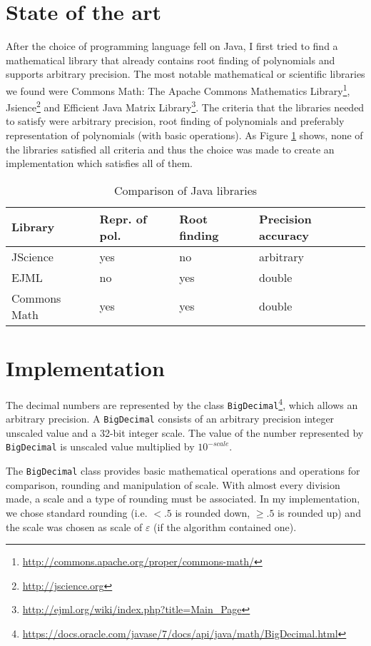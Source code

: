 \documentclass[
  digital, %
  notable,   %
  nolof,     %
  nolot,     %
	final, %
]{fithesis3}
\begin{document}
\section{State of the art}
After the choice of programming language fell on Java, I first tried to find a mathematical library that already contains root finding of polynomials and supports arbitrary precision. The most notable mathematical or scientific libraries we found were Commons Math: The Apache Commons Mathematics Library\footnote{\url{http://commons.apache.org/proper/commons-math/}}, Jsience\footnote{\url{http://jscience.org}} and Efficient Java Matrix Library\footnote{\url{http://ejml.org/wiki/index.php?title=Main_Page}}. The criteria that the libraries needed to satisfy were arbitrary precision, root finding of polynomials and preferably representation of polynomials (with basic operations). As Figure \ref{tab:sota} shows, none of the libraries satisfied all criteria and thus the choice was made to create an implementation which satisfies all of them.

\FloatBarrier
\begin{table}[H]
  \begin{tabular*}{\textwidth}{llll}
    \toprule
    Library & Repr. of pol. & Root finding & Precision accuracy\\
    \midrule
				JScience & yes & no & arbitrary \\
				EJML & no & yes & double \\
				Commons Math & yes & yes & double \\
    \bottomrule
  \end{tabular*}
  \caption{Comparison of Java libraries}
  \label{tab:sota}
\end{table}

\section{Implementation}
The decimal numbers are represented by the class \texttt{BigDecimal}\footnote{\url{https://docs.oracle.com/javase/7/docs/api/java/math/BigDecimal.html}}, which allows an arbitrary precision. A \texttt{BigDecimal} consists of an arbitrary precision integer unscaled value and a 32-bit integer scale. The value of the number represented by \texttt{BigDecimal} is unscaled value multiplied by $10^{-scale}$.

The \texttt{BigDecimal} class provides basic mathematical operations and operations for comparison, rounding and manipulation of scale. With almost every division made, a scale and a type of rounding must be associated. In my implementation, we chose standard rounding (i.e. $<.5$ is rounded down, $\geq.5$ is rounded up) and the scale was chosen as scale of $\varepsilon$ (if the algorithm contained one).
\end{document}
